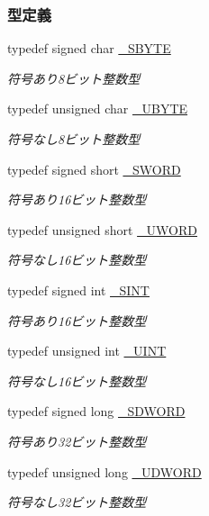 \subsubsection*{型定義}
\begin{DoxyCompactItemize}
\item 
typedef signed char \hyperlink{stddef_8h_aab65237ca9fbf4192a39cf12dd165942_aab65237ca9fbf4192a39cf12dd165942}{\+\_\+\+S\+B\+Y\+T\+E}
\begin{DoxyCompactList}\small\item\em 符号あり8ビット整数型 \end{DoxyCompactList}\item 
typedef unsigned char \hyperlink{stddef_8h_aac464b47452ce9406f88ef194e2becc1_aac464b47452ce9406f88ef194e2becc1}{\+\_\+\+U\+B\+Y\+T\+E}
\begin{DoxyCompactList}\small\item\em 符号なし8ビット整数型 \end{DoxyCompactList}\item 
typedef signed short \hyperlink{stddef_8h_a2c7cee059ec16036635c7e5500eb5e5d_a2c7cee059ec16036635c7e5500eb5e5d}{\+\_\+\+S\+W\+O\+R\+D}
\begin{DoxyCompactList}\small\item\em 符号あり16ビット整数型 \end{DoxyCompactList}\item 
typedef unsigned short \hyperlink{stddef_8h_af4b45f5ec97da370bd2173b4fe891d76_af4b45f5ec97da370bd2173b4fe891d76}{\+\_\+\+U\+W\+O\+R\+D}
\begin{DoxyCompactList}\small\item\em 符号なし16ビット整数型 \end{DoxyCompactList}\item 
typedef signed int \hyperlink{stddef_8h_aefd1068e35d26c0e7d7079ddf2579174_aefd1068e35d26c0e7d7079ddf2579174}{\+\_\+\+S\+I\+N\+T}
\begin{DoxyCompactList}\small\item\em 符号あり16ビット整数型 \end{DoxyCompactList}\item 
typedef unsigned int \hyperlink{stddef_8h_af1d4b529b856acadd9e1b43f5d794d24_af1d4b529b856acadd9e1b43f5d794d24}{\+\_\+\+U\+I\+N\+T}
\begin{DoxyCompactList}\small\item\em 符号なし16ビット整数型 \end{DoxyCompactList}\item 
typedef signed long \hyperlink{stddef_8h_a931e4fd9bf350284fc21e94cd5ee126f_a931e4fd9bf350284fc21e94cd5ee126f}{\+\_\+\+S\+D\+W\+O\+R\+D}
\begin{DoxyCompactList}\small\item\em 符号あり32ビット整数型 \end{DoxyCompactList}\item 
typedef unsigned long \hyperlink{stddef_8h_a1fd04328ad1e5a3e83788b99cddc35dd_a1fd04328ad1e5a3e83788b99cddc35dd}{\+\_\+\+U\+D\+W\+O\+R\+D}
\begin{DoxyCompactList}\small\item\em 符号なし32ビット整数型 \end{DoxyCompactList}\end{DoxyCompactItemize}
